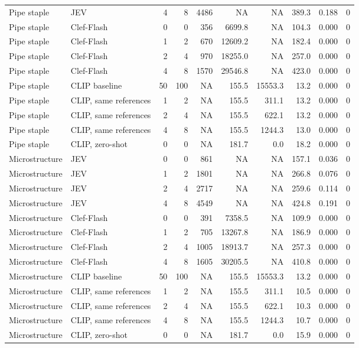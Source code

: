 \begin{table}
\begin{tabular}[t]{llrrrrrrrr}
Pipe staple & JEV & 4 & 8 & 4486 & NA & NA & 389.3 & 0.188 & 0\\
Pipe staple & Clef-Flash & 0 & 0 & 356 & 6699.8 & NA & 104.3 & 0.000 & 0\\
Pipe staple & Clef-Flash & 1 & 2 & 670 & 12609.2 & NA & 182.4 & 0.000 & 0\\
\addlinespace
Pipe staple & Clef-Flash & 2 & 4 & 970 & 18255.0 & NA & 257.0 & 0.000 & 0\\
Pipe staple & Clef-Flash & 4 & 8 & 1570 & 29546.8 & NA & 423.0 & 0.000 & 0\\
Pipe staple & CLIP baseline & 50 & 100 & NA & 155.5 & 15553.3 & 13.2 & 0.000 & 0\\
Pipe staple & CLIP, same references & 1 & 2 & NA & 155.5 & 311.1 & 13.2 & 0.000 & 0\\
Pipe staple & CLIP, same references & 2 & 4 & NA & 155.5 & 622.1 & 13.2 & 0.000 & 0\\
\addlinespace
Pipe staple & CLIP, same references & 4 & 8 & NA & 155.5 & 1244.3 & 13.0 & 0.000 & 0\\
Pipe staple & CLIP, zero-shot & 0 & 0 & NA & 181.7 & 0.0 & 18.2 & 0.000 & 0\\
Microstructure & JEV & 0 & 0 & 861 & NA & NA & 157.1 & 0.036 & 0\\
Microstructure & JEV & 1 & 2 & 1801 & NA & NA & 266.8 & 0.076 & 0\\
Microstructure & JEV & 2 & 4 & 2717 & NA & NA & 259.6 & 0.114 & 0\\
\addlinespace
Microstructure & JEV & 4 & 8 & 4549 & NA & NA & 424.8 & 0.191 & 0\\
Microstructure & Clef-Flash & 0 & 0 & 391 & 7358.5 & NA & 109.9 & 0.000 & 0\\
Microstructure & Clef-Flash & 1 & 2 & 705 & 13267.8 & NA & 186.9 & 0.000 & 0\\
Microstructure & Clef-Flash & 2 & 4 & 1005 & 18913.7 & NA & 257.3 & 0.000 & 0\\
Microstructure & Clef-Flash & 4 & 8 & 1605 & 30205.5 & NA & 410.8 & 0.000 & 0\\
\addlinespace
Microstructure & CLIP baseline & 50 & 100 & NA & 155.5 & 15553.3 & 13.2 & 0.000 & 0\\
Microstructure & CLIP, same references & 1 & 2 & NA & 155.5 & 311.1 & 10.5 & 0.000 & 0\\
Microstructure & CLIP, same references & 2 & 4 & NA & 155.5 & 622.1 & 10.3 & 0.000 & 0\\
Microstructure & CLIP, same references & 4 & 8 & NA & 155.5 & 1244.3 & 10.7 & 0.000 & 0\\
Microstructure & CLIP, zero-shot & 0 & 0 & NA & 181.7 & 0.0 & 15.9 & 0.000 & 0\\
\bottomrule
\end{tabular}
\end{table}
